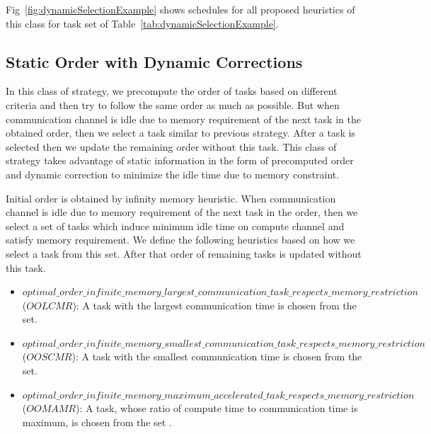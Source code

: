 \documentclass[sigconf]{acmart}
\begin{document}
Fig~\ref{fig:dynamicSelectionExample} shows schedules for all proposed heuristics of this class for task set of Table~\ref{tab:dynamicSelectionExample}.

\subsection{Static Order with Dynamic Corrections}

In this class of strategy, we precompute the order of tasks based on different criteria and then try to follow the same order as much as possible. But when communication channel is idle due to memory requirement of the next task in the obtained order, then we select a task similar to previous strategy. After a task is selected then we update the remaining order without this task. This class of strategy takes advantage of  static information in the form of precomputed order and dynamic correction to minimize the idle time due to memory constraint.

Initial order is obtained by infinity memory heuristic. When communication channel is idle due to memory requirement of the next task in the order, then we select a set of tasks which induce minimum idle time on compute channel and satisfy memory requirement. We define the following heuristics based on how we select a task from this set. After that order of remaining  tasks is updated without this task.

\begin{itemize}[a)]
	\item $optimal\_order\_infinite\_memory\_largest\_communication\_task\_respects\_memory\_restriction$ ($OOLCMR$): A task with the largest communication time is chosen from the set.
	\item $optimal\_order\_infinite\_memory\_smallest\_communication\_task\_respects\_memory\_restriction$ ($OOSCMR$):  A task with the smallest communication time is chosen from the set.
	\item $optimal\_order\_infinite\_memory\_maximum\_accelerated\_task\_respects\_memory\_restriction$ ($OOMAMR$): A task,  whose ratio of compute time to communication time is maximum, is chosen from the set .
\end{itemize}
\end{document}

